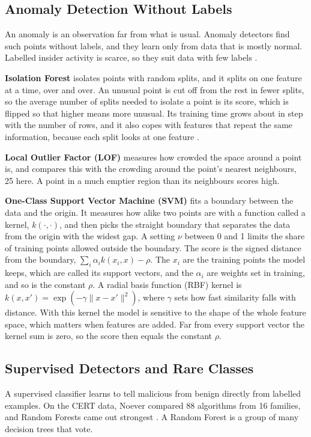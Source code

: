 \documentclass[a4paper,12pt]{article}
\begin{document}
\subsection{Anomaly Detection Without Labels}
An anomaly is an observation far from what is usual. Anomaly detectors find such points without labels, and they learn only from data that is mostly normal. Labelled insider activity is scarce, so they suit data with few labels \cite{Chandola2009}.

\textbf{Isolation Forest} \cite{Liu2008} isolates points with random splits, and it splits on one feature at a time, over and over. An unusual point is cut off from the rest in fewer splits, so the average number of splits needed to isolate a point is its score, which is flipped so that higher means more unusual. Its training time grows about in step with the number of rows, and it also copes with features that repeat the same information, because each split looks at one feature \cite{Liu2008}.

\textbf{Local Outlier Factor (LOF)} \cite{Breunig2000} measures how crowded the space around a point is, and compares this with the crowding around the point's nearest neighbours, 25 here. A point in a much emptier region than its neighbours scores high.

\textbf{One-Class Support Vector Machine (SVM)} \cite{Scholkopf2001} fits a boundary between the data and the origin. It measures how alike two points are with a function called a kernel, $k(\cdot,\cdot)$, and then picks the straight boundary that separates the data from the origin with the widest gap. A setting $\nu$ between 0 and 1 limits the share of training points allowed outside the boundary. The score is the signed distance from the boundary, $\sum_i \alpha_i k(x_i, x) - \rho$. The $x_i$ are the training points the model keeps, which are called its support vectors, and the $\alpha_i$ are weights set in training, and so is the constant $\rho$. A radial basis function (RBF) kernel is $k(x, x') = \exp(-\gamma \|x - x'\|^2)$, where $\gamma$ sets how fast similarity falls with distance. With this kernel the model is sensitive to the shape of the whole feature space, which matters when features are added. Far from every support vector the kernel sum is zero, so the score then equals the constant $\rho$.

\subsection{Supervised Detectors and Rare Classes}
A supervised classifier learns to tell malicious from benign directly from labelled examples. On the CERT data, Noever compared 88 algorithms from 16 families, and Random Forests came out strongest \cite{Noever2019}. A Random Forest is a group of many decision trees that vote.
\end{document}
